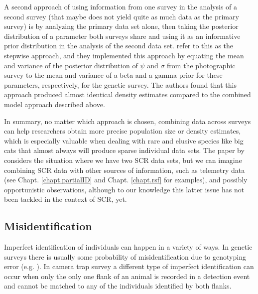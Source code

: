 A second approach of using information from one survey in the analysis
of a second survey (that maybe does not yield quite as much data as
the primary survey) is by analyzing the %
primary data set alone, then
taking the posterior distribution of a parameter both surveys share
and using it as an informative prior distribution in the analysis of
the second data set. \citet{gopalaswamy_etal:2012mee} refer to this as
the stepwise approach, and they implemented this approach by equating
the mean and variance of the posterior distribution of $\psi$ and
$\sigma$ from the photographic survey to the mean and variance of a
beta and a gamma prior for these parameters, respectively, for the
genetic survey. The authors found that this approach produced almost
identical density estimates compared to the combined model approach
described above.

In summary, no matter which approach is chosen, combining data across
surveys can help researchers %
obtain more precise population size or
density
estimates, which is especially valuable when dealing with rare and
elusive species like big cats that almost always will produce sparse
individual data sets.
The paper by \citet{gopalaswamy_etal:2012mee} considers the
situation where we have two SCR data sets, but we can imagine
combining SCR data with other sources of information, such as
telemetry data (see Chapt. \ref{chapt.partialID} and
Chapt. \ref{chapt.rsf} for examples), and possibly opportunistic
observations, although to our knowledge this latter issue has not been
tackled in the context of SCR, yet.


\subsection{Misidentification}

Imperfect identification of individuals can happen in a variety of
ways. In genetic surveys there is usually some probability of
misidentification %
due to genotyping error
(e.g. \citet{lukacs_burnham:2005}). In camera trap survey a different
type of imperfect identification can occur when only the only one
flank of an animal is recorded in a detection event and %
cannot be matched to any of the individuals identified by both
flanks.

